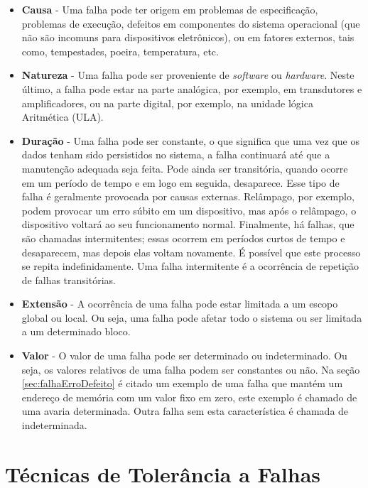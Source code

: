 \begin{itemize}
	\item \textbf{Causa} - Uma falha pode ter origem em problemas de especificação, problemas de execução, defeitos em componentes do sistema operacional (que não são incomuns para dispositivos eletrônicos), ou em fatores externos, tais como, tempestades, poeira, temperatura, etc.
	
	\item \textbf{Natureza} - Uma falha pode ser proveniente de \textit{software} ou \textit{hardware}. Neste último, a falha pode estar na parte analógica, por exemplo, em transdutores e amplificadores, ou na parte digital, por exemplo, na unidade lógica Aritmética (ULA).
	
	\item \textbf{Duração} - Uma falha pode ser constante, o que significa que uma vez que os dados tenham sido persistidos no sistema, a falha continuará até que a manutenção adequada seja feita. Pode ainda ser transitória, quando ocorre em um período de tempo e em logo em seguida, desaparece. Esse tipo de falha é geralmente provocada por causas externas. Relâmpago, por exemplo, podem provocar um erro súbito em um dispositivo, mas após o relâmpago, o dispositivo voltará ao seu funcionamento normal. Finalmente, há falhas, que são chamadas intermitentes; essas ocorrem em períodos curtos de tempo e desaparecem, mas depois elas voltam novamente. É possível que este processo se repita indefinidamente. Uma falha intermitente é a ocorrência de repetição de falhas transitórias.
	
	\item \textbf{Extensão} - A ocorrência de uma falha pode estar limitada a um escopo global ou local. Ou seja, uma falha pode afetar todo o sistema ou ser limitada a um determinado bloco. 
	
	\item \textbf{Valor} - O valor de uma falha pode ser determinado ou indeterminado. Ou seja, os valores relativos de uma falha podem ser constantes ou não. Na seção \ref{sec:falhaErroDefeito} é citado um exemplo de uma falha que mantém um endereço de memória com um valor fixo em zero, este exemplo é chamado de uma avaria determinada. Outra falha sem esta característica é chamada de indeterminada.
	
	
	
\end{itemize}


\section{Técnicas de Tolerância a Falhas}\label{sec:tecnica}


